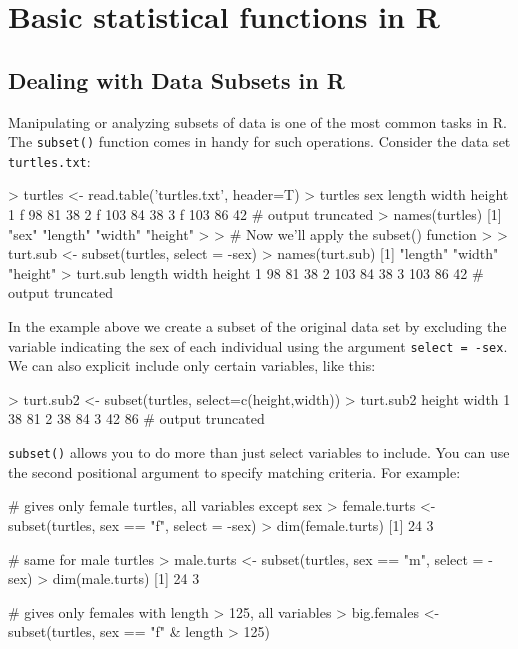 
\section{Basic statistical functions in R}

\subsection{Dealing with Data Subsets in R}

Manipulating or analyzing subsets of data is one of the most common
tasks in R. The \lstinline!subset()! function comes in handy for such
operations. Consider the data set \lstinline!turtles.txt!:
%
\begin{R}
> turtles <- read.table('turtles.txt', header=T)
> turtles
   sex length width height
1    f     98    81     38
2    f    103    84     38
3    f    103    86     42
  # output truncated
> names(turtles)
[1] "sex"    "length" "width"  "height"
>
> # Now we'll apply the subset() function
>
> turt.sub <- subset(turtles, select = -sex)
> names(turt.sub)
[1] "length" "width"  "height"
> turt.sub
   length width height
1      98    81     38
2     103    84     38
3     103    86     42
  # output truncated
\end{R}
%
In the example above we create a subset of the original data set by
excluding the variable indicating the sex of each individual using the
argument \lstinline!select = -sex!. We can also explicit include only
certain variables, like this:
%
\begin{R}
> turt.sub2 <- subset(turtles, select=c(height,width))
> turt.sub2
   height width
1      38    81
2      38    84
3      42    86
  # output truncated    
\end{R}
%
\lstinline!subset()! allows you to do more than just select variables to
include. You can use the second positional argument to specify matching
criteria. For example:
%
\begin{R}
# gives only female turtles, all variables except sex
> female.turts <- subset(turtles, sex == "f", select = -sex)
> dim(female.turts)
[1] 24  3

# same for male turtles
> male.turts <- subset(turtles, sex == "m", select = -sex)
> dim(male.turts)
[1] 24  3

# gives only females with length > 125, all variables
> big.females <- subset(turtles, sex == "f" & length > 125)    
\end{R}

